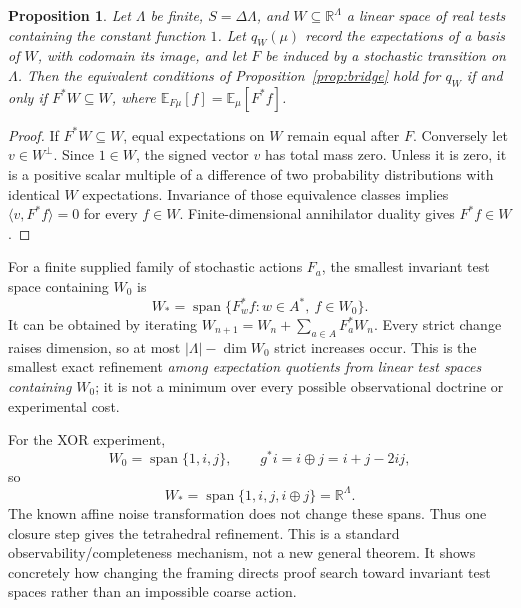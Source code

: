 \documentclass[11pt]{article}
\newtheorem{proposition}[theorem]{Proposition}
\theoremstyle{definition}
\newcommand{\R}{\mathbb R}
\begin{document}
\begin{proposition}\label{prop:testclosure}
Let $\Lambda$ be finite, $S=\Delta\Lambda$, and $W\subseteq\R^\Lambda$ a linear space of real tests containing the constant function $1$. Let $q_W(\mu)$ record the expectations of a basis of $W$, with codomain its image, and let $F$ be induced by a stochastic transition on $\Lambda$. Then the equivalent conditions of Proposition~\ref{prop:bridge} hold for $q_W$ if and only if $F^*W\subseteq W$, where
$\mathbb E_{F\mu}[f]=\mathbb E_\mu[F^*f]$.
\end{proposition}
\begin{proof}
If $F^*W\subseteq W$, equal expectations on $W$ remain equal after $F$. Conversely let $v\in W^\perp$. Since $1\in W$, the signed vector $v$ has total mass zero. Unless it is zero, it is a positive scalar multiple of a difference of two probability distributions with identical $W$ expectations. Invariance of those equivalence classes implies $\langle v,F^*f\rangle=0$ for every $f\in W$. Finite-dimensional annihilator duality gives $F^*f\in W$.
\end{proof}
For a finite supplied family of stochastic actions $F_a$, the smallest invariant test space containing $W_0$ is
\[
 W_* = \operatorname{span}\{F_w^*f:w\in A^*,\ f\in W_0\}.
\]
It can be obtained by iterating $W_{n+1}=W_n+\sum_{a\in A}F_a^*W_n$. Every strict change raises dimension, so at most $|\Lambda|-\dim W_0$ strict increases occur. This is the smallest exact refinement \emph{among expectation quotients from linear test spaces containing $W_0$}; it is not a minimum over every possible observational doctrine or experimental cost.

For the XOR experiment,
\[
 W_0=\operatorname{span}\{1,i,j\},\qquad
 g^*i=i\mathbin{\oplus}j=i+j-2ij,
\]
so
\[
 W_*=\operatorname{span}\{1,i,j,i\mathbin{\oplus}j\}=\R^\Lambda.
\]
The known affine noise transformation does not change these spans. Thus one closure step gives the tetrahedral refinement. This is a standard observability/completeness mechanism, not a new general theorem. It shows concretely how changing the framing directs proof search toward invariant test spaces rather than an impossible coarse action.
\end{document}
